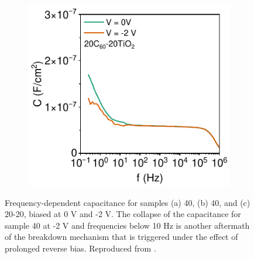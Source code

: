 \begin{figure}[htbp]
\begin{subfigure}{0.32\textwidth}
        \caption{}
        \label{}
    \end{subfigure}
    \hfill
    \begin{subfigure}{0.32\textwidth}
        \centering
        \includegraphics[width=\textwidth]{chapters/transport_layers/images/Cf_20_20.pdf}
        \caption{}
        \label{}
    \end{subfigure}
    
    \caption[Frequency-dependent capacitance for samples with various combinations of the - bi-layer configuration.]{Frequency-dependent capacitance for samples (a) 40, (b) 40, and (c) 20-20, biased at 0 V and -2 V. The collapse of the capacitance for sample 40 at -2 V and frequencies below 10 Hz is another aftermath of the breakdown mechanism that is triggered under the effect of prolonged reverse bias. Reproduced from \cite{Papadopoulou2025ElectronSpeed}.}
    \label{fig:etl_opt:cf_all}
\end{figure}

